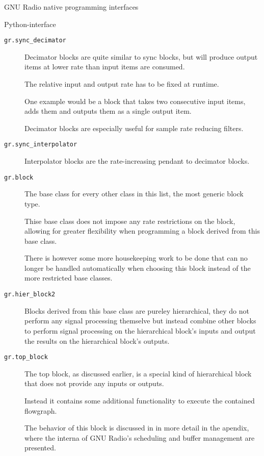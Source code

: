 \begin{subchapter}{GNU Radio native programming interfaces}
\begin{subsubchapter}{Python-interface}
\begin{description}
      \item[\texttt{gr.sync\_decimator}]
        Decimator blocks are quite similar to sync blocks,
        but will produce output items at lower rate than input items
        are consumed.

        The relative input and output rate has to be fixed at runtime.

        One example would be a block that takes two consecutive input
        items, adds them and outputs them as a single output item.

        Decimator blocks are especially useful for
        sample rate reducing filters.

      \item[\texttt{gr.sync\_interpolator}]
        Interpolator blocks are the rate-increasing pendant
        to decimator blocks.

      \item[\texttt{gr.block}]
        The base class for every other class
        in this list, the most generic block type.

        Thise base class does not impose any rate restrictions
        on the block, allowing for greater flexibility when
        programming a block derived from this base class.

        There is however some more housekeeping work to be
        done that can no longer be handled automatically when
        choosing this block instead of the more restricted base classes.

      \item[\texttt{gr.hier\_block2}]
        Blocks derived from this base class are pureley
        hierarchical, they do not perform any signal processing
        themselve but instead combine other blocks to perform
        signal processing on the hierarchical block's inputs and
        output the results on the hierarchical block's outputs.

      \item[\texttt{gr.top\_block}]
        The top block, as discussed earlier, is a special kind of
        hierarchical block that does not provide any inputs or outputs.

        Instead it contains some additional functionality to execute
        the contained flowgraph.

        The behavior of this block is discussed in in more detail in the
        apendix, where the interna of GNU Radio's scheduling
        and buffer management are presented.
    \end{description}


\end{subsubchapter}
\end{subchapter}
